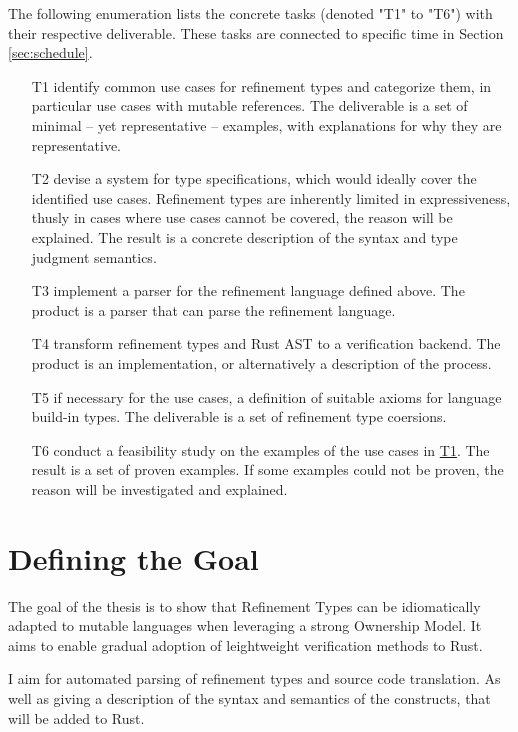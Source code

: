 \documentclass[11pt]{article}
\begin{document}
The following enumeration lists the concrete tasks (denoted "T1" to "T6") with their respective deliverable. These tasks are connected to specific time in Section \ref{sec:schedule}.

\begin{itemize}
	\item[T1] \label{itm:T1} identify common use cases for refinement types and categorize them, in particular use cases with mutable references. The deliverable is a set of minimal -- yet representative -- examples, with explanations for why they are representative.
	\item[T2] devise a system for type specifications, which would ideally cover the identified use cases. Refinement types are inherently limited in expressiveness, thusly in cases where use cases cannot be covered, the reason will be explained. The result is a concrete description of the syntax and type judgment semantics.
	\item[T3] implement a parser for the refinement language defined above. The product is a parser that can parse the refinement language.
	\item[T4] transform refinement types and Rust AST to a verification backend. The product is an implementation, or alternatively a description of the process.
	\item[T5] if necessary for the use cases, a definition of suitable axioms for language build-in types. The deliverable is a set of refinement type coersions.
	\item[T6] conduct a feasibility study on the examples of the use cases in \hyperref[itm:T1]{T1}. The result is a set of proven examples. If some examples could not be proven, the reason will be investigated and explained.
\end{itemize}


\section{Defining the Goal}

The goal of the thesis is to show that Refinement Types can be idiomatically adapted to mutable languages when leveraging a strong Ownership Model. It aims to enable gradual adoption of leightweight verification methods to Rust.

I aim for automated parsing of refinement types and source code translation. As well as giving a description of the syntax and semantics of the constructs, that will be added to Rust.
\end{document}
